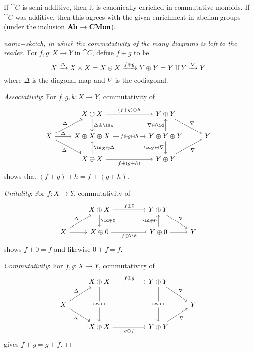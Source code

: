 \documentclass[../main.tex]{subfiles}
\begin{document}
\begin{lem}
  If $\cat C$ is semi-additive, then it is canonically enriched in commutative monoids. If $\cat C$ was additive, then this agrees with the given enrichment in abelian groups (under the inclusion $\mathbf{Ab} \hookrightarrow \mathbf{CMon}$).
\end{lem}
\begin{proof}[name={sketch, in which the commutativity of the many diagrams is left to the reader}]
  For $f, g\colon X \to Y$ in $\cat C$, define $f + g$ to be
  \[
    X \xrightarrow{\Delta} X \times X = X \oplus X \xrightarrow{f \oplus g} Y \oplus Y = Y \amalg Y \xrightarrow{\nabla} Y
  \] where $\Delta$ is the diagonal map and $\nabla$ is the codiagonal.

  \emph{Associativity}: For $f, g, h\colon X\to Y$, commutativity of 
\[\begin{tikzcd}
  & {X\oplus X} && {Y\oplus Y} \\
  X & {X\oplus X\oplus X} && {Y\oplus Y\oplus Y} & Y \\
  & {X\oplus X} && {Y\oplus Y}
  \arrow["\Delta", from=2-1, to=1-2]
  \arrow["{\id_X \oplus \Delta}"', from=3-2, to=2-2]
  \arrow["{\Delta \oplus \id_X}", from=1-2, to=2-2]
  \arrow["\Delta", from=2-1, to=2-2]
  \arrow["\Delta"', from=2-1, to=3-2]
  \arrow["{f \oplus(g+h)}"', from=3-2, to=3-4]
  \arrow["{(f+g)\oplus h}", from=1-2, to=1-4]
  \arrow["{\nabla \oplus \id}", from=2-4, to=1-4]
  \arrow["{\id_Y \oplus \nabla}"', from=2-4, to=3-4]
  \arrow["\nabla"', from=3-4, to=2-5]
  \arrow["\nabla", from=1-4, to=2-5]
  \arrow["{f\oplus g\oplus h}"{description}, from=2-2, to=2-4]
\end{tikzcd}\]  
  shows that $(f+g) + h = f + (g + h)$.

  \emph{Unitality}: For $f\colon X \to Y$, commutativity of 
\[\begin{tikzcd}
  & {X\oplus X} && {Y\oplus Y} \\
  X & {X \oplus 0} && {Y\oplus 0} & Y
  \arrow[from=2-1, to=2-2]
  \arrow["\id\oplus0", from=1-2, to=2-2]
  \arrow["\Delta", from=2-1, to=1-2]
  \arrow["{f\oplus \id}"', from=2-2, to=2-4]
  \arrow["{f\oplus 0}", from=1-2, to=1-4]
  \arrow["\nabla", from=1-4, to=2-5]
  \arrow[from=2-4, to=2-5]
  \arrow["{\id \oplus 0}", from=2-4, to=1-4]
\end{tikzcd}\]  
   shows $f + 0 = f$ and likewise $ 0 + f = f$.

   \emph{Commutativity}: For $f,g\colon X \to Y$, commutativity of 
\[\begin{tikzcd}
  & {X\oplus X} && {Y\oplus Y} \\
  X &&&& Y \\
  & {X\oplus X} && {Y\oplus Y}
  \arrow["\nabla", from=1-4, to=2-5]
  \arrow["\nabla"', from=3-4, to=2-5]
  \arrow["{g \oplus f}"', from=3-2, to=3-4]
  \arrow["{f\oplus g}", from=1-2, to=1-4]
  \arrow["\Delta", from=2-1, to=1-2]
  \arrow["\Delta"', from=2-1, to=3-2]
  \arrow["{\text{swap}}"{description}, from=1-2, to=3-2]
  \arrow["{\text{swap}}"{description}, from=1-4, to=3-4]
\end{tikzcd}\]   gives $f + g = g + f$.


\end{proof}
\end{document}
